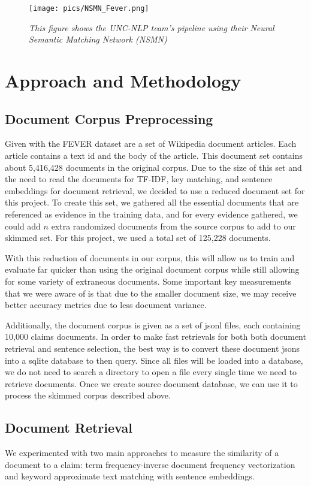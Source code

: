 \documentclass[11pt,a4paper]{article}
\begin{document}
\begin{figure}
  \texttt{[image: pics/NSMN\_Fever.png]}
  \caption{\small \sl This figure shows the UNC-NLP team's pipeline using their Neural Semantic Matching Network (NSMN) \label{fig:NSMN}}
\end{figure}

\section{Approach and Methodology}

\subsection{Document Corpus Preprocessing}
Given with the FEVER dataset are a set of Wikipedia document articles. Each article contains a text id and the body of the article. This document set contains about 5,416,428 documents in the original corpus. Due to the size of this set and the need to read the documents for TF-IDF, key matching, and sentence embeddings for document retrieval, we decided to use a reduced document set for this project. To create this set, we gathered all the essential documents that are referenced as evidence in the training data, and for every evidence gathered, we could add $n$ extra randomized documents from the source corpus to add to our skimmed set. For this project, we used a total set of 125,228 documents.

With this reduction of documents in our corpus, this will allow us to train and evaluate far quicker than using the original document corpus while still allowing for some variety of extraneous documents. Some important key measurements that we were aware of is that due to the smaller document size, we may receive better accuracy metrics due to less document variance.

Additionally, the document corpus is given as a set of jsonl files, each containing 10,000 claims documents. In order to make fast retrievals for both both document retrieval and sentence selection, the best way is to convert these document jsons into a sqlite database to then query. Since all files will be loaded into a database, we do not need to search a directory to open a file every single time we need to retrieve documents. Once we create source document database, we can use it to process the skimmed corpus described above.

\subsection{Document Retrieval}
We experimented with two main approaches to measure the similarity of a document to a claim: term frequency-inverse document frequency vectorization and keyword approximate text matching with sentence embeddings.
\end{document}
